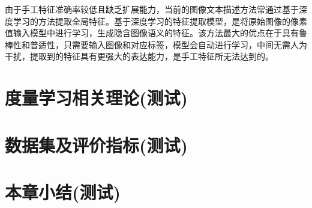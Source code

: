 由于手工特征准确率较低且缺乏扩展能力，当前的图像文本描述方法常通过基于深度学习的方法提取全局特征。基于深度学习的特征提取模型，是将原始图像的像素值输入模型中进行学习，生成隐含图像语义的特征。该方法最大的优点在于具有鲁棒性和普适性，只需要输入图像和对应标签，模型会自动进行学习，中间无需人为干扰，提取到的特征具有更强大的表达能力，是手工特征所无法达到的。

\section{度量学习相关理论(测试)}

\section{数据集及评价指标(测试)}

\section{本章小结(测试)}